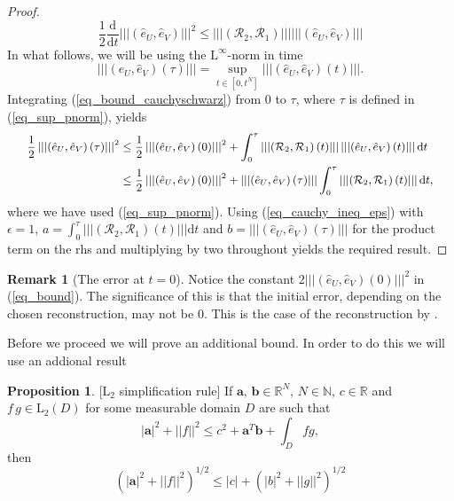 \documentclass[12pt,a4paper]{article}
\numberwithin{equation}{section}
\theoremstyle{definition}
\newcommand{\pnorm}[1]{\left|\left|\left|#1\right|\right|\right|}
\newcommand{\norm}[1]{\left|#1\right|}
\newcommand{\Norm}[1]{\left|\left|#1\right|\right|}
\newcommand{\vect}[1]{\textbf{#1}}
\newcommand{\leb}{\text{L}}
\newcommand{\qp}[1]{\left(#1\right)}
\newcommand{\qb}[1]{\left[#1\right]}
\newtheorem{Proposition}[subsection]{Proposition}
\newtheorem{Rem}[subsection]{Remark}
\begin{document}
\begin{proof}
\begin{equation}\label{eq_bound_cauchyschwarz}
\frac{1}{2}\frac{\mathrm{d}}{\mathrm{d}t}\pnorm{\qp{\hat{e}_U,\hat{e}_V}}^2
  \leq  \pnorm{\qp{\mathcal{R}_2,\mathcal{R}_1}} \pnorm{\qp{\hat{e}_U,\hat{e}_V}}
\end{equation}
In what follows, we will be using the $\leb^\infty$-norm in time
\begin{equation}\label{eq_sup_pnorm}
\pnorm{\qp{\hat{e}_U, \hat{e}_V}\qp{\tau}}=\sup_{t\in\qb{0,t^N}}\pnorm{\qp{\hat{e}_U, \hat{e}_V}\qp{t}}.
\end{equation}
Integrating (\ref{eq_bound_cauchyschwarz}) from $0$ to $\tau$, where $\tau$ is defined in (\ref{eq_sup_pnorm}), yields
\begin{equation}
\small
\begin{aligned}
\frac{1}{2}\pnorm{\qp{\hat{e}_U, \hat{e}_V}\qp{\tau}}^2&\leq
\frac{1}{2}\pnorm{\qp{\hat{e}_U, \hat{e}_V}\qp{0}}^2
+\int_0^\tau\pnorm{\qp{\mathcal{R}_2,\mathcal{R}_1}\qp{t}} \pnorm{\qp{\hat{e}_U,\hat{e}_V}\qp{t}}\mathrm{d}t\\
&\leq \frac{1}{2}\pnorm{\qp{\hat{e}_U, \hat{e}_V}\qp{0}}^2
+\pnorm{\qp{\hat{e}_U,\hat{e}_V}\qp{\tau}}\int_0^\tau\pnorm{\qp{\mathcal{R}_2,\mathcal{R}_1}\qp{t}} \mathrm{d}t,
\end{aligned}
\end{equation}
where we have used (\ref{eq_sup_pnorm}).
Using (\ref{eq_cauchy_ineq_eps}) with $\epsilon=1$, $a=\int_0^\tau\pnorm{\qp{\mathcal{R}_2,\mathcal{R}_1}\qp{t}} \mathrm{d}t$ and $b=\pnorm{\qp{\hat{e}_U,\hat{e}_V}\qp{\tau}}$ for the product term on the rhs and multiplying by two throughout yields the required result.
\end{proof}

\begin{Rem}[The error at $t=0$]
	Notice the constant $2\pnorm{\qp{\hat{e}_U,\hat{e}_V}\qp{0}}^2$ in (\ref{eq_bound}).  The significance of this is that the initial error, depending on the chosen reconstruction, may not be $0$.  This is the case of the reconstruction by \cite{georgoulis2016posteriori}.
\end{Rem}

Before we proceed we will prove an additional bound.  In order to do this we will use an addional result
\begin{Proposition}\label{lemma:L2_simplification}[$\leb_2$ simplification rule] If $\vect{a},\, \vect{b}\in \mathbb{R}^N,\, N\in \mathbb{N}$, $c\in \mathbb{R}$ and $f\,g \in \leb_2\qp{D}$ for some measurable domain $D$ are such that 
	\begin{equation*}
\norm{\vect{a}}^2 +\Norm{{f}}^2\leq c^2+\vect{a}^T\vect{b}+\int_D fg,
 	\end{equation*}
then
\begin{equation}
\qp{\norm{\vect{a}}^2 +\Norm{{f}}^2}^{1/2}\leq \norm{c}+\qp{\norm{{b}}^2+\Norm{g}^2}^{1/2}
\end{equation}
\end{Proposition}
\end{document}
